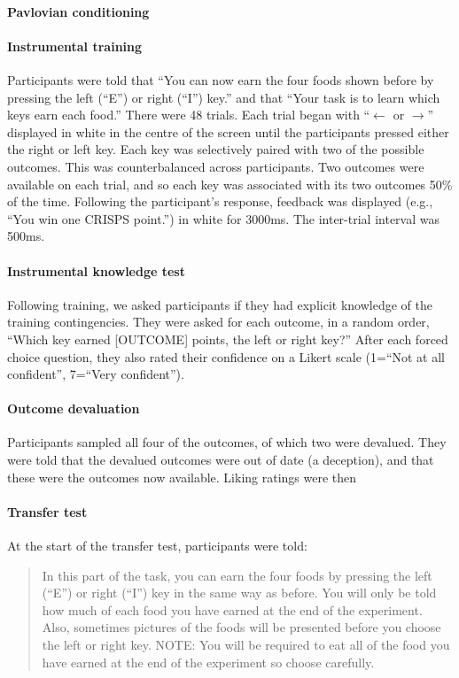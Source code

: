 \documentclass[12pt]{article}
\begin{document}
\paragraph{Pavlovian conditioning}

\paragraph{Instrumental training} Participants were told that ``You can now
earn the four foods shown before by pressing the left (``E'') or right (``I'')
key.'' and that ``Your task is to learn which keys earn each food.'' There were
48 trials. Each trial began with ``$\leftarrow$ or $\rightarrow$'' displayed in
white in the centre of the screen until the participants pressed either the
right or left key. Each key was selectively paired with two of the possible
outcomes. This was counterbalanced across participants. Two outcomes were
available on each trial, and so each key was associated with its two outcomes
50\% of the time. Following the participant's response, feedback was displayed 
(e.g., ``You win one CRISPS point.'') in white for 3000ms. The inter-trial
interval was 500ms.

\paragraph{Instrumental knowledge test}
Following training, we asked participants if they had explicit knowledge of the
training contingencies. They were asked for each outcome, in a random order,
``Which key earned [OUTCOME] points, the left or right key?'' After each forced
choice question, they also rated their confidence on a Likert scale (1=``Not at
all confident'', 7=``Very confident''). 

\paragraph{Outcome devaluation}
Participants sampled all four of the outcomes, of which two were devalued. They
were told that the devalued outcomes were out of date (a deception), and that
these were the outcomes now available. Liking ratings were then 

\paragraph{Transfer test}
At the start of the transfer test, participants were told: 

\blockquote{In this part of the task, you can earn the four foods by pressing
the left (``E'') or right (``I'') key in the same way as before. You will only
be told how much of each food you have earned at the end of the experiment.
Also, sometimes pictures of the foods will be presented before you choose the
left or right key. NOTE: You will be required to eat all of the food you have
earned at the end of the experiment so choose carefully.}
\end{document}

